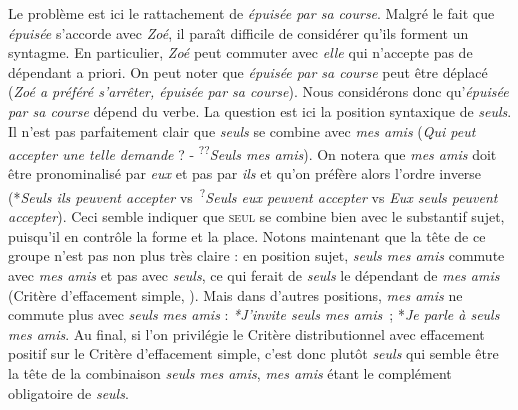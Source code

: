 {\begin{exe}
     Le problème est ici le rattachement de \textit{épuisée par sa course}. Malgré le fait que \textit{épuisée} s’accorde avec \textit{Zoé}, il paraît difficile de considérer qu’ils forment un syntagme. En particulier, \textit{Zoé} peut commuter avec \textit{elle} qui n’accepte pas de dépendant a priori. On peut noter que \textit{épuisée par sa course} peut être déplacé (\textit{Zoé a préféré s’arrêter, épuisée par sa course}). Nous considérons donc qu’\textit{épuisée par sa course} dépend du verbe.
     La question est ici la position syntaxique de \textit{seuls}. Il n’est pas parfaitement clair que \textit{seuls} se combine avec \textit{mes amis} (\textit{Qui peut accepter une telle demande} ? - \textsuperscript{??}\textit{Seuls mes amis}). On notera que \textit{mes amis} doit être pronominalisé par \textit{eux} et pas par \textit{ils} et qu’on préfère alors l’ordre inverse (*\textit{Seuls ils peuvent accepter} vs~\textsuperscript{?}\textit{Seuls eux peuvent accepter} vs \textit{Eux seuls peuvent accepter}). Ceci semble indiquer que \textsc{seul} se combine bien avec le substantif sujet, puisqu'il en contrôle la forme et la place. Notons maintenant que la tête de ce groupe n’est pas non plus très claire : en position sujet, \textit{seuls mes amis} commute avec \textit{mes amis} et pas avec \textit{seuls}, ce qui ferait de \textit{seuls} le dépendant de \textit{mes amis} (Critère d'effacement simple, ). Mais dans d’autres positions, \textit{mes amis} ne commute plus avec \textit{seuls mes amis} : \textit{*J’invite seuls mes amis~}; *\textit{Je parle à seuls mes amis}. Au final, si l’on privilégie le Critère distributionnel avec effacement positif sur le Critère d’effacement simple, c’est donc plutôt \textit{seuls} qui semble être la tête de la combinaison \textit{seuls mes amis}, \textit{mes amis} étant le complément obligatoire de \textit{seuls}.
    \end{exe}

}
